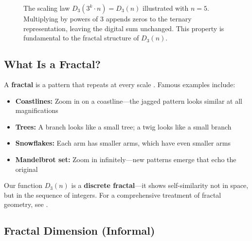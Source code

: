 \begin{figure}[h]
\centering

\caption{The scaling law $D_3(3^k \cdot n) = D_3(n)$ illustrated with $n = 5$. Multiplying by powers of 3 appends zeros to the ternary representation, leaving the digital sum unchanged. This property is fundamental to the fractal structure of $D_3(n)$.}
\label{fig:scalinglaw}
\end{figure}

\subsection{What Is a Fractal?}
\label{subsec:what-is-fractal}


\begin{intuitive}
A \textbf{fractal} is a pattern that repeats at every scale \cite{mandelbrot1982}. Famous examples include:

\begin{itemize}
\item \textbf{Coastlines:} Zoom in on a coastline—the jagged pattern looks similar at all magnifications
\item \textbf{Trees:} A branch looks like a small tree; a twig looks like a small branch
\item \textbf{Snowflakes:} Each arm has smaller arms, which have even smaller arms
\item \textbf{Mandelbrot set:} Zoom in infinitely—new patterns emerge that echo the original
\end{itemize}

Our function $D_3(n)$ is a \textbf{discrete fractal}—it shows self-similarity not in space, but in the sequence of integers. For a comprehensive treatment of fractal geometry, see \cite{falconer2004}.
\end{intuitive}

\subsection{Fractal Dimension (Informal)}
\label{subsec:fractal-dimension}


